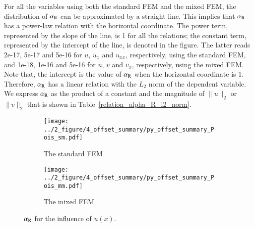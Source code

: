 \documentclass[review,3p]{elsarticle}
\begin{document}
For all the variables using both the standard FEM and the mixed FEM, the distribution of $\alpha_{\rm R}$ can be approximated by a straight line. This implies that $\alpha_{\rm R}$ has a power-law relation with the horizontal coordinate. The power term, represented by the slope of the line, is 1 for all the relations; the constant term, represented by the intercept of the line, is denoted in the figure. The latter reads 2e-17, 5e-17 and 5e-16 for $u$, $u_x$ and $u_{xx}$, respectively, using the standard FEM, and 1e-18, 1e-16 and 5e-16 for $u$, $v$ and $v_x$, respectively, using the mixed FEM. Note that, the intercept is the value of $\alpha_{\rm R}$ when the horizontal coordinate is 1. Therefore, $\alpha_{\rm R}$ has a linear relation with the $L_2$ norm of the dependent variable. We express $\alpha_{\rm R}$ as the product of a constant and the magnitude of $\|u\|_2$ or $\|v\|_2$ that is shown in Table~\ref{relation_alpha_R_l2_norm}.

\begin{figure}[!ht]
	\centering
    \begin{subfigure}{6.0cm}
        \texttt{[image: ../2\_figure/4\_offset\_summary/py\_offset\_summary\_Pois\_sm.pdf]}
        \caption{The standard FEM}
        \label{py_offset_summary_Pois_sm}
    \end{subfigure}
    \hspace{-0.2cm}
    \begin{subfigure}{6.0cm}
        \texttt{[image: ../2\_figure/4\_offset\_summary/py\_offset\_summary\_Pois\_mm.pdf]}
        \caption{The mixed FEM}
        \label{py_offset_summary_Pois_mm}
    \end{subfigure}
\caption{$\alpha_{\rm R}$ for the influence of $u(x)$.}
\label{py_offset_summary_Pois}
\end{figure}
\end{document}

